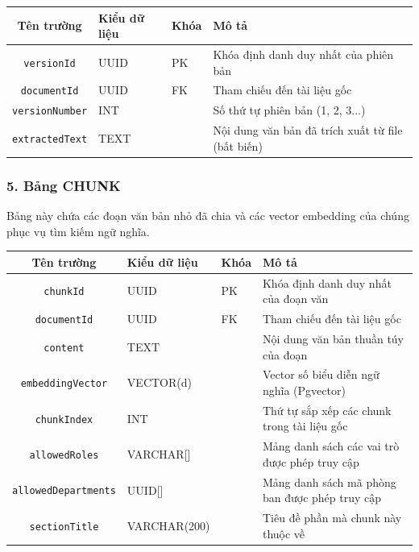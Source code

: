 \documentclass[12pt,a4paper]{report}
\begin{document}
\begin{table}[H]
\centering
\begin{tabularx}{\textwidth}{|c|l|l|X|}
\hline
\rowcolor{gray!10}
Tên trường & Kiểu dữ liệu & Khóa & Mô tả \\ \hline
\texttt{versionId} & UUID & PK & Khóa định danh duy nhất của phiên bản \\ \hline
\texttt{documentId} & UUID & FK & Tham chiếu đến tài liệu gốc \\ \hline
\texttt{versionNumber} & INT &  & Số thứ tự phiên bản (1, 2, 3...) \\ \hline
\texttt{extractedText} & TEXT &  & Nội dung văn bản đã trích xuất từ file (bất biến) \\ \hline
\end{tabularx}
\end{table}

\subsubsection{5. Bảng CHUNK}
Bảng này chứa các đoạn văn bản nhỏ đã chia và các vector embedding của chúng phục vụ tìm kiếm ngữ nghĩa.

\begin{table}[H]
\centering
\begin{tabularx}{\textwidth}{|c|l|l|X|}
\hline
\rowcolor{gray!10}
Tên trường & Kiểu dữ liệu & Khóa & Mô tả \\ \hline
\texttt{chunkId} & UUID & PK & Khóa định danh duy nhất của đoạn văn \\ \hline
\texttt{documentId} & UUID & FK & Tham chiếu đến tài liệu gốc \\ \hline
\texttt{content} & TEXT &  & Nội dung văn bản thuần túy của đoạn \\ \hline
\texttt{embeddingVector} & VECTOR(d) &  & Vector số biểu diễn ngữ nghĩa (Pgvector) \\ \hline
\texttt{chunkIndex} & INT &  & Thứ tự sắp xếp các chunk trong tài liệu gốc \\ \hline
\texttt{allowedRoles} & VARCHAR[] &  & Mảng danh sách các vai trò được phép truy cập \\ \hline
\texttt{allowedDepartments} & UUID[] &  & Mảng danh sách mã phòng ban được phép truy cập \\ \hline
\texttt{sectionTitle} & VARCHAR(200) &  & Tiêu đề phần mà chunk này thuộc về \\ \hline
\end{tabularx}
\end{table}
\end{document}

